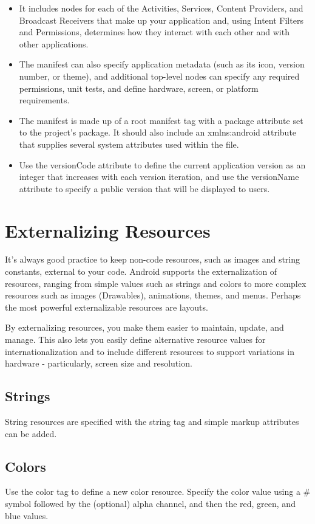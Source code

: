 \begin{itemize}
	\item It includes nodes for each of the Activities, Services, Content Providers, and Broadcast Receivers that make up your application and, using Intent Filters and Permissions, determines how they interact with each other and with other applications.
	\item The manifest can also specify application metadata (such as its icon, version number, or theme), and additional top-level nodes can specify any required permissions, unit tests, and define hardware, screen, or platform requirements.
	\item The manifest is made up of a root manifest tag with a package attribute set to the project’s package. It should also include an xmlns:android attribute that supplies several system attributes used within the file.
	\item Use the versionCode attribute to define the current application version as an integer that increases with each version iteration, and use the versionName attribute to specify a public version that will be displayed to users.
\end{itemize}

\section{Externalizing Resources}
It’s always good practice to keep non-code resources, such as images and string constants, external to your code. Android supports the externalization of resources, ranging from simple values such as strings and colors to more complex resources such as images (Drawables), animations, themes, and menus. Perhaps the most powerful externalizable resources are layouts.

By externalizing resources, you make them easier to maintain, update, and manage. This also lets you easily define alternative resource values for internationalization and to include different resources to support variations in hardware - particularly, screen size and resolution.

\subsection{Strings}
String resources are specified with the string tag and simple markup attributes can be added.
\subsection{Colors}
Use the color tag to define a new color resource. Specify the color value using a \# symbol followed by the (optional) alpha channel, and then the red, green, and blue values.
